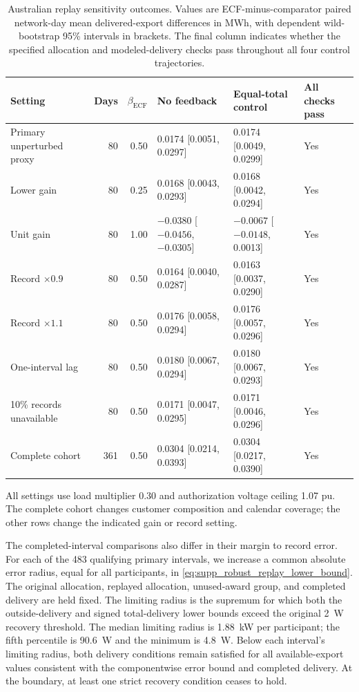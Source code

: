 \documentclass[11pt]{article}
\begin{document}
\begin{table}[!htbp]
\centering
\caption{Australian replay sensitivity outcomes. Values are ECF-minus-comparator
paired network-day mean delivered-export differences in MWh, with dependent
wild-bootstrap 95\% intervals in brackets. The final column indicates whether
the specified allocation and modeled-delivery checks pass throughout all four
control trajectories.}
\label{tab:supp_au_sensitivities}
\scriptsize
\setlength{\tabcolsep}{3.0pt}
\begin{tabular}{@{}lrrp{}p{}l@{}}
\toprule
Setting & Days & $\beta_{\mathrm{ECF}}$ & No feedback & Equal-total control & All checks pass \\
\midrule
Primary unperturbed proxy & 80 & 0.50 & 0.0174 [0.0051, 0.0297] & 0.0174 [0.0049, 0.0299] & Yes \\
Lower gain & 80 & 0.25 & 0.0168 [0.0043, 0.0293] & 0.0168 [0.0042, 0.0294] & Yes \\
Unit gain & 80 & 1.00 & $-0.0380$ [$-0.0456$, $-0.0305$] & $-0.0067$ [$-0.0148$, 0.0013] & Yes \\
Record $\times0.9$ & 80 & 0.50 & 0.0164 [0.0040, 0.0287] & 0.0163 [0.0037, 0.0290] & Yes \\
Record $\times1.1$ & 80 & 0.50 & 0.0176 [0.0058, 0.0294] & 0.0176 [0.0057, 0.0296] & Yes \\
One-interval lag & 80 & 0.50 & 0.0180 [0.0067, 0.0294] & 0.0180 [0.0067, 0.0293] & Yes \\
10\% records unavailable & 80 & 0.50 & 0.0171 [0.0047, 0.0295] & 0.0171 [0.0046, 0.0296] & Yes \\
Complete cohort & 361 & 0.50 & 0.0304 [0.0214, 0.0393] & 0.0304 [0.0217, 0.0390] & Yes \\
\bottomrule
\end{tabular}

\vspace{2pt}
\parbox{0.97\textwidth}{\scriptsize All settings use load multiplier 0.30 and
authorization voltage ceiling 1.07 pu. The complete cohort changes customer
composition and calendar coverage; the other rows change the indicated gain
or record setting.}
\end{table}

The completed-interval comparisons also differ in their margin to record
error. For each of the 483 qualifying primary intervals, we increase a common
absolute error radius, equal for all participants, in
\eqref{eq:supp_robust_replay_lower_bound}. The original allocation, replayed
allocation, unused-award group, and completed delivery are held fixed. The
limiting radius is the supremum for which both the outside-delivery and signed
total-delivery lower bounds exceed the original 2~W recovery threshold.
The median limiting radius is 1.88~kW per participant; the fifth percentile
is 90.6~W and the minimum is 4.8~W. Below each interval's limiting radius,
both delivery conditions remain satisfied for all available-export values
consistent with the componentwise error bound and completed delivery. At the
boundary, at least one strict recovery condition ceases to hold.
\end{document}

